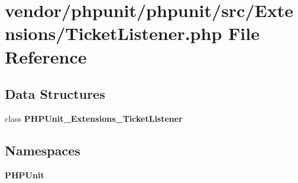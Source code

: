 \section{vendor/phpunit/phpunit/src/\+Extensions/\+Ticket\+Listener.php File Reference}
\label{_ticket_listener_8php}
\subsection*{Data Structures}
\begin{DoxyCompactItemize}
\item 
class {\bf P\+H\+P\+Unit\+\_\+\+Extensions\+\_\+\+Ticket\+Listener}
\end{DoxyCompactItemize}
\subsection*{Namespaces}
\begin{DoxyCompactItemize}
\item 
 {\bf P\+H\+P\+Unit}
\end{DoxyCompactItemize}
